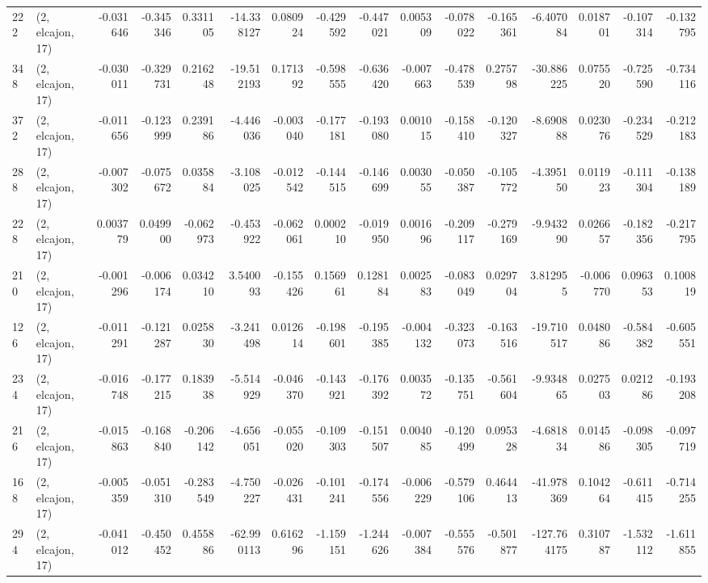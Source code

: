 \begin{tabular}{llrrrrrrrrrrrrrr}
222 &  (2, elcajon, 17) &  -0.031646 & -0.345346 &  0.331105 &  -14.338127 &  0.080924 &  -0.429592 & -0.447021 &  0.005309 & -0.078022 & -0.165361 &    -6.407084 &  0.018701 & -0.107314 & -0.132795 \\
348 &  (2, elcajon, 17) &  -0.030011 & -0.329731 &  0.216248 &  -19.512193 &  0.171392 &  -0.598555 & -0.636420 & -0.007663 & -0.478539 &  0.275798 &   -30.886225 &  0.075520 & -0.725590 & -0.734116 \\
372 &  (2, elcajon, 17) &  -0.011656 & -0.123999 &  0.239186 &   -4.446036 & -0.003040 &  -0.177181 & -0.193080 &  0.001015 & -0.158410 & -0.120327 &    -8.690888 &  0.023076 & -0.234529 & -0.212183 \\
288 &  (2, elcajon, 17) &  -0.007302 & -0.075672 &  0.035884 &   -3.108025 & -0.012542 &  -0.144515 & -0.146699 &  0.003055 & -0.050387 & -0.105772 &    -4.395150 &  0.011923 & -0.111304 & -0.138189 \\
228 &  (2, elcajon, 17) &   0.003779 &  0.049900 & -0.062973 &   -0.453922 & -0.062061 &   0.000210 & -0.019950 &  0.001696 & -0.209117 & -0.279169 &    -9.943290 &  0.026657 & -0.182356 & -0.217795 \\
210 &  (2, elcajon, 17) &  -0.001296 & -0.006174 &  0.034210 &    3.540093 & -0.155426 &   0.156961 &  0.128184 &  0.002583 & -0.083049 &  0.029704 &     3.812955 & -0.006770 &  0.096353 &  0.100819 \\
126 &  (2, elcajon, 17) &  -0.011291 & -0.121287 &  0.025830 &   -3.241498 &  0.012614 &  -0.198601 & -0.195385 & -0.004132 & -0.323073 & -0.163516 &   -19.710517 &  0.048086 & -0.584382 & -0.605551 \\
234 &  (2, elcajon, 17) &  -0.016748 & -0.177215 &  0.183938 &   -5.514929 & -0.046370 &  -0.143921 & -0.176392 &  0.003572 & -0.135751 & -0.561604 &    -9.934865 &  0.027503 &  0.021286 & -0.193208 \\
216 &  (2, elcajon, 17) &  -0.015863 & -0.168840 & -0.206142 &   -4.656051 & -0.055020 &  -0.109303 & -0.151507 &  0.004085 & -0.120499 &  0.095328 &    -4.681834 &  0.014586 & -0.098305 & -0.097719 \\
168 &  (2, elcajon, 17) &  -0.005359 & -0.051310 & -0.283549 &   -4.750227 & -0.026431 &  -0.101241 & -0.174556 & -0.006229 & -0.579106 &  0.464413 &   -41.978369 &  0.104264 & -0.611415 & -0.714255 \\
294 &  (2, elcajon, 17) &  -0.041012 & -0.450452 &  0.455886 &  -62.990113 &  0.616296 &  -1.159151 & -1.244626 & -0.007384 & -0.555576 & -0.501877 &  -127.764175 &  0.310787 & -1.532112 & -1.611855 \\

\end{tabular}
